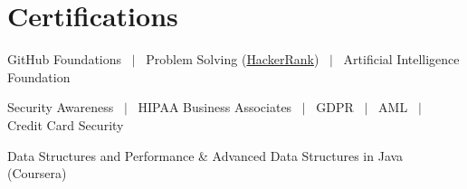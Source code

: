 \documentclass[letterpaper,10pt]{article}
\newenvironment{resume_list}{
  \vspace{-6pt}
  \begin{itemize}[itemsep=-1px, parsep=0.5pt, topsep=1pt, leftmargin=22pt]
}{
  \end{itemize}
  \vspace{-2pt}
}
\begin{document}
\section{Certifications}
\begin{resume_list}
  \item GitHub Foundations ~$|$~ Problem Solving (\href{https://www.hackerrank.com/profile/sooraj_bcss19}{HackerRank}) ~$|$~ Artificial Intelligence Foundation
  \item Security Awareness ~$|$~ HIPAA Business Associates ~$|$~ GDPR ~$|$~ AML ~$|$~ Credit Card Security
  \item Data Structures and Performance \& Advanced Data Structures in Java (Coursera)
\end{resume_list}
\end{document}
